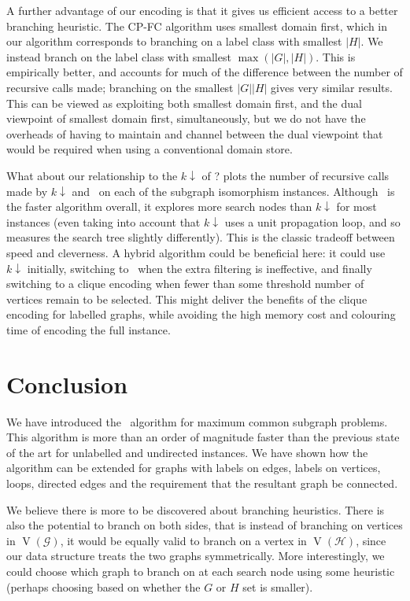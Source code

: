 \documentclass[letterpaper]{article}
\newcommand{\citet}[1]{\citeauthor{#1} \shortcite{#1}}
\newcommand{\citep}[1]{\cite{#1}}
\newcommand{\McSplit}{\textproc{McSplit}}
\newcommand{\graphG}{\mathcal{G}}
\newcommand{\graphH}{\mathcal{H}}
\newcommand{\setG}{G}
\newcommand{\setH}{H}
\DeclareMathOperator{\V}{V}
\begin{document}
A further advantage of our encoding is that it gives us efficient access to a
better branching heuristic. The CP-FC algorithm uses smallest domain first,
which in our algorithm corresponds to branching on a label class with smallest
$|\setH|$. We instead branch on the label class with smallest $\max(|\setG|,|\setH|)$.
This is empirically better, and accounts for much of the difference between
the number of recursive calls made; branching on the smallest $|\setG| |\setH|$ gives
very similar results. This can be viewed as exploiting both smallest domain first,
and the dual viewpoint \citep{DBLP:conf/ecai/Geelen92} of smallest domain
first, simultaneously, but we do not have the overheads of having to maintain
and channel between the dual viewpoint that would be required when using a
conventional domain store.

What about our relationship to the $k{\downarrow}$ of
\citet{UpcomingAAAIPaper}?   plots the number of
recursive calls made by $k{\downarrow}$ and \McSplit\ on each of the subgraph
isomorphism instances. Although \McSplit\ is the faster algorithm overall, it
explores more search nodes than $k{\downarrow}$ for most instances (even taking
into account that $k{\downarrow}$ uses a unit propagation loop, and so measures
the search tree slightly differently). This is the classic tradeoff between
speed and cleverness. A hybrid algorithm could be beneficial here: it could use
$k{\downarrow}$ initially, switching to \McSplit\ when the extra filtering is
ineffective, and finally switching to a clique encoding when fewer than some
threshold number of vertices remain to be selected. This might deliver the
benefits of the clique encoding for labelled graphs, while avoiding the high
memory cost and colouring time of encoding the full instance.

\section{Conclusion}

We have introduced the \McSplit\ algorithm for maximum common subgraph
problems.  This algorithm is more than an order of magnitude faster than the
previous state of the art for unlabelled and undirected instances. We have
shown how the algorithm can be extended for graphs with labels on edges, labels
on vertices, loops, directed edges and the requirement that the resultant graph
be connected.

We believe there is more to be discovered about branching heuristics. There is
also the potential to branch on both sides, that is instead of branching on
vertices in $\V(\graphG)$, it would be equally valid to branch on a vertex in
$\V(\graphH)$, since our data structure treats the two graphs symmetrically. More
interestingly, we could choose which graph to branch on at each search node
using some heuristic (perhaps choosing based on whether the $\setG$ or $\setH$ set is
smaller).
\end{document}
